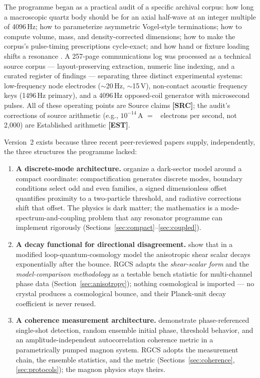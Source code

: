 \documentclass[10pt,letterpaper]{article}
\newcommand{\cltag}[2]{\textcolor{#1}{{\fontspec{TeX Gyre Heros}\scriptsize\bfseries[#2]}}}
\newcommand{\EST}{\cltag{estcol}{EST}}   %
\newcommand{\SRC}{\cltag{srccol}{SRC}}   %
\begin{document}
The programme began as a practical audit of a specific archival corpus: how
long a macroscopic quartz body should be for an axial half-wave at an
integer multiple of 4096\,Hz; how to parameterize asymmetric Vogel-style
terminations; how to compute volume, mass, and density-corrected
dimensions; how to make the corpus's pulse-timing prescriptions
cycle-exact; and how hand or fixture loading shifts a resonance
\citep{greenv18}. A 257-page communications log \citep{jenhanlog} was
processed as a technical source corpus — layout-preserving extraction,
numeric line indexing, and a curated register of findings — separating
three distinct experimental systems: low-frequency node electrodes
($\sim$20\,Hz, $\sim$15\,V), non-contact acoustic frequency keys (1496\,Hz
primary), and a 4096\,Hz opposed-coil generator with microsecond pulses.
All of these operating points are Source claims \SRC; the audit's
corrections of source arithmetic (e.g., $10^{-14}$\,A $=$
\gvElectronRate\ electrons per second, not 2{,}000) are Established
arithmetic \EST.

Version~2 exists because three recent peer-reviewed papers supply,
independently, the three structures the programme lacked:

\begin{enumerate}
\item \textbf{A discrete-mode architecture.} \citet{leetsai2026} organize a
dark-sector model around a compact coordinate: compactification generates
discrete modes, boundary conditions select odd and even families, a signed
dimensionless offset quantifies proximity to a two-particle threshold, and
radiative corrections shift that offset. The physics is dark matter; the
mathematics is a mode-spectrum-and-coupling problem that any resonator
programme can implement rigorously (Sections~\ref{sec:compact}--\ref{sec:coupled}).
\item \textbf{A decay functional for directional disagreement.}
\citet{gan2025} show that in a modified loop-quantum-cosmology model the
anisotropic shear scalar decays exponentially after the bounce. RGCS adapts
the \emph{shear-scalar form} and the \emph{model-comparison methodology} as
a testable bench statistic for multi-channel phase data
(Section~\ref{sec:anisotropy}); nothing cosmological is imported — no
crystal produces a cosmological bounce, and their Planck-unit decay
coefficient is never reused.
\item \textbf{A coherence measurement architecture.} \citet{koster2026}
demonstrate phase-referenced single-shot detection, random ensemble
initial phase, threshold behavior, and an amplitude-independent
autocorrelation coherence metric in a parametrically pumped magnon system.
RGCS adopts the measurement chain, the ensemble statistics, and the metric
(Sections~\ref{sec:coherence}, \ref{sec:protocols}); the magnon physics
stays theirs.
\end{enumerate}
\end{document}
